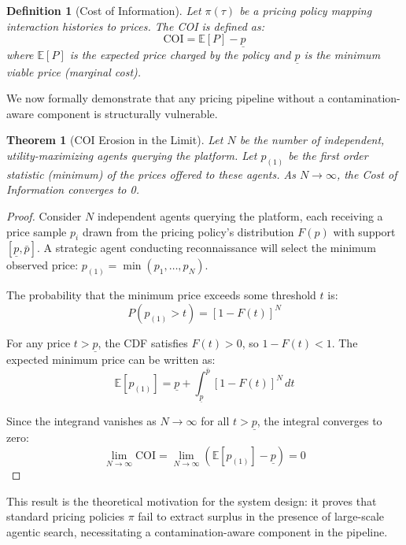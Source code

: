 \documentclass[sigconf]{acmart}
\newtheorem{theorem}{Theorem}
\newtheorem{definition}{Definition}
\begin{document}
\begin{definition}[Cost of Information]
Let $\pi(\tau)$ be a pricing policy mapping interaction histories to prices. The COI is defined as:
\begin{equation}
\text{COI} = \mathbb{E}[P] - \underline{p}
\end{equation}
where $\mathbb{E}[P]$ is the expected price charged by the policy and $\underline{p}$ is the minimum viable price (marginal cost).
\end{definition}

We now formally demonstrate that any pricing pipeline without a contamination-aware component is structurally vulnerable.

\begin{theorem}[COI Erosion in the Limit]
Let $N$ be the number of independent, utility-maximizing agents querying the platform. Let $p_{(1)}$ be the first order statistic (minimum) of the prices offered to these agents. As $N \to \infty$, the Cost of Information converges to 0.
\end{theorem}

\begin{proof}
Consider $N$ independent agents querying the platform, each receiving a price sample $p_i$ drawn from the pricing policy's distribution $F(p)$ with support $[\underline{p}, \bar{p}]$. A strategic agent conducting reconnaissance will select the minimum observed price: $p_{(1)} = \min(p_1, \ldots, p_N)$.

The probability that the minimum price exceeds some threshold $t$ is:
\begin{equation}
P(p_{(1)} > t) = [1 - F(t)]^N
\end{equation}

For any price $t > \underline{p}$, the CDF satisfies $F(t) > 0$, so $1 - F(t) < 1$. The expected minimum price can be written as:
\begin{equation}
\mathbb{E}[p_{(1)}] = \underline{p} + \int_{\underline{p}}^{\bar{p}} [1 - F(t)]^N \, dt
\end{equation}

Since the integrand vanishes as $N \to \infty$ for all $t > \underline{p}$, the integral converges to zero:
\begin{equation}
\lim_{N \to \infty} \text{COI} = \lim_{N \to \infty} (\mathbb{E}[p_{(1)}] - \underline{p}) = 0
\end{equation}
\end{proof}

This result is the theoretical motivation for the system design: it proves that standard pricing policies $\pi$ fail to extract surplus in the presence of large-scale agentic search, necessitating a contamination-aware component in the pipeline.
\end{document}
